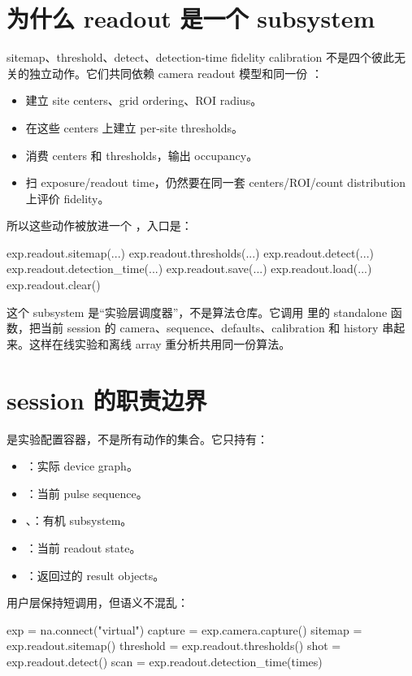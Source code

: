 \documentclass[11pt,oneside,openany]{book}
\begin{document}
\section{为什么 readout 是一个 subsystem}
sitemap、threshold、detect、detection-time fidelity calibration 不是四个彼此无关的独立动作。它们共同依赖 camera readout 模型和同一份 ：
\begin{itemize}
  \item {} 建立 site centers、grid ordering、ROI radius。
  \item {} 在这些 centers 上建立 per-site thresholds。
  \item {} 消费 centers 和 thresholds，输出 occupancy。
  \item {} 扫 exposure/readout time，仍然要在同一套 centers/ROI/count distribution 上评价 fidelity。
\end{itemize}

所以这些动作被放进一个 ，入口是：
\begin{codeblock}[Python]
exp.readout.sitemap(...)
exp.readout.thresholds(...)
exp.readout.detect(...)
exp.readout.detection_time(...)
exp.readout.save(...)
exp.readout.load(...)
exp.readout.clear()
\end{codeblock}

这个 subsystem 是“实验层调度器”，不是算法仓库。它调用  里的 standalone 函数，把当前 session 的 camera、sequence、defaults、calibration 和 history 串起来。这样在线实验和离线 array 重分析共用同一份算法。

\section{session 的职责边界}
 是实验配置容器，不是所有动作的集合。它只持有：
\begin{itemize}
  \item {}：实际 device graph。
  \item {}：当前 pulse sequence。
  \item {}、：有机 subsystem。
  \item {}：当前 readout state。
  \item {}：返回过的 result objects。
\end{itemize}

用户层保持短调用，但语义不混乱：
\begin{codeblock}[Python]
exp = na.connect("virtual")
capture = exp.camera.capture()
sitemap = exp.readout.sitemap()
threshold = exp.readout.thresholds()
shot = exp.readout.detect()
scan = exp.readout.detection_time(times)
\end{codeblock}
\end{document}
